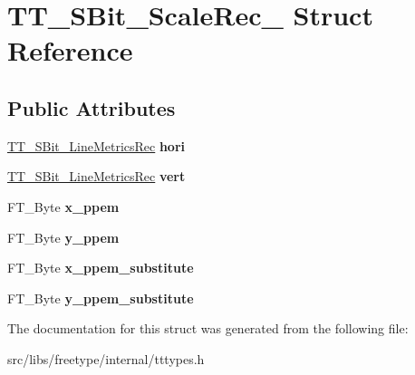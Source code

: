 \hypertarget{struct_t_t___s_bit___scale_rec__}{
\section{TT\_\-SBit\_\-ScaleRec\_\- Struct Reference}
\label{struct_t_t___s_bit___scale_rec__}
}
\subsection*{Public Attributes}
\begin{DoxyCompactItemize}
\item 
\hypertarget{struct_t_t___s_bit___scale_rec___a2a61bc97ebb7ed996170a03612ffbbc0}{
\hyperlink{struct_t_t___s_bit___line_metrics_rec__}{TT\_\-SBit\_\-LineMetricsRec} {\bfseries hori}}
\label{struct_t_t___s_bit___scale_rec___a2a61bc97ebb7ed996170a03612ffbbc0}

\item 
\hypertarget{struct_t_t___s_bit___scale_rec___acbf5c459602d9f52ac04a914e2f12375}{
\hyperlink{struct_t_t___s_bit___line_metrics_rec__}{TT\_\-SBit\_\-LineMetricsRec} {\bfseries vert}}
\label{struct_t_t___s_bit___scale_rec___acbf5c459602d9f52ac04a914e2f12375}

\item 
\hypertarget{struct_t_t___s_bit___scale_rec___a235731b0452ea063cccacd2f59b3f44c}{
FT\_\-Byte {\bfseries x\_\-ppem}}
\label{struct_t_t___s_bit___scale_rec___a235731b0452ea063cccacd2f59b3f44c}

\item 
\hypertarget{struct_t_t___s_bit___scale_rec___aa4c1fb419ea55c8c587ba81700c6ce66}{
FT\_\-Byte {\bfseries y\_\-ppem}}
\label{struct_t_t___s_bit___scale_rec___aa4c1fb419ea55c8c587ba81700c6ce66}

\item 
\hypertarget{struct_t_t___s_bit___scale_rec___a71955e363b0b5da84ed2c15d0e6f832d}{
FT\_\-Byte {\bfseries x\_\-ppem\_\-substitute}}
\label{struct_t_t___s_bit___scale_rec___a71955e363b0b5da84ed2c15d0e6f832d}

\item 
\hypertarget{struct_t_t___s_bit___scale_rec___a3a9f554d0153f9e3022898c1f59a7b63}{
FT\_\-Byte {\bfseries y\_\-ppem\_\-substitute}}
\label{struct_t_t___s_bit___scale_rec___a3a9f554d0153f9e3022898c1f59a7b63}

\end{DoxyCompactItemize}


The documentation for this struct was generated from the following file:\begin{DoxyCompactItemize}
\item 
src/libs/freetype/internal/tttypes.h\end{DoxyCompactItemize}
